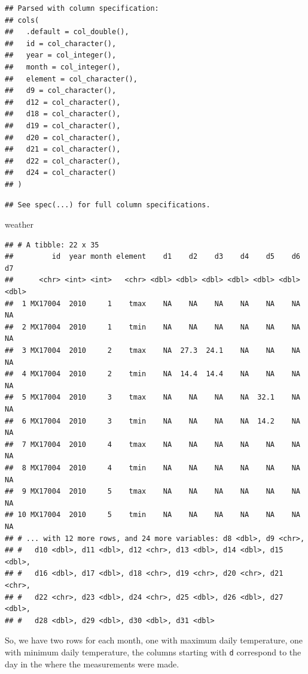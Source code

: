 \documentclass[]{book}
\newenvironment{Shaded}{\begin{snugshade}}{\end{snugshade}}
\newcommand{\NormalTok}[1]{#1}
\theoremstyle{definition}
\theoremstyle{definition}
\theoremstyle{remark}
\begin{document}
\begin{verbatim}
## Parsed with column specification:
## cols(
##   .default = col_double(),
##   id = col_character(),
##   year = col_integer(),
##   month = col_integer(),
##   element = col_character(),
##   d9 = col_character(),
##   d12 = col_character(),
##   d18 = col_character(),
##   d19 = col_character(),
##   d20 = col_character(),
##   d21 = col_character(),
##   d22 = col_character(),
##   d24 = col_character()
## )
\end{verbatim}

\begin{verbatim}
## See spec(...) for full column specifications.
\end{verbatim}

\begin{Shaded}
\begin{Highlighting}[]
\NormalTok{weather}
\end{Highlighting}
\end{Shaded}

\begin{verbatim}
## # A tibble: 22 x 35
##         id  year month element    d1    d2    d3    d4    d5    d6    d7
##      <chr> <int> <int>   <chr> <dbl> <dbl> <dbl> <dbl> <dbl> <dbl> <dbl>
##  1 MX17004  2010     1    tmax    NA    NA    NA    NA    NA    NA    NA
##  2 MX17004  2010     1    tmin    NA    NA    NA    NA    NA    NA    NA
##  3 MX17004  2010     2    tmax    NA  27.3  24.1    NA    NA    NA    NA
##  4 MX17004  2010     2    tmin    NA  14.4  14.4    NA    NA    NA    NA
##  5 MX17004  2010     3    tmax    NA    NA    NA    NA  32.1    NA    NA
##  6 MX17004  2010     3    tmin    NA    NA    NA    NA  14.2    NA    NA
##  7 MX17004  2010     4    tmax    NA    NA    NA    NA    NA    NA    NA
##  8 MX17004  2010     4    tmin    NA    NA    NA    NA    NA    NA    NA
##  9 MX17004  2010     5    tmax    NA    NA    NA    NA    NA    NA    NA
## 10 MX17004  2010     5    tmin    NA    NA    NA    NA    NA    NA    NA
## # ... with 12 more rows, and 24 more variables: d8 <dbl>, d9 <chr>,
## #   d10 <dbl>, d11 <dbl>, d12 <chr>, d13 <dbl>, d14 <dbl>, d15 <dbl>,
## #   d16 <dbl>, d17 <dbl>, d18 <chr>, d19 <chr>, d20 <chr>, d21 <chr>,
## #   d22 <chr>, d23 <dbl>, d24 <chr>, d25 <dbl>, d26 <dbl>, d27 <dbl>,
## #   d28 <dbl>, d29 <dbl>, d30 <dbl>, d31 <dbl>
\end{verbatim}

So, we have two rows for each month, one with maximum daily temperature,
one with minimum daily temperature, the columns starting with \texttt{d}
correspond to the day in the where the measurements were made.
\end{document}
